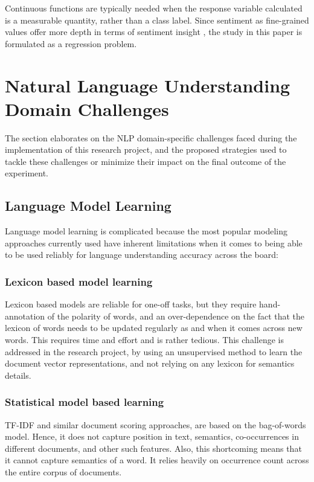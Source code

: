 \documentclass[conference]{IEEEtran}
\begin{document}
        Continuous functions are typically needed when the response variable calculated is a measurable quantity, rather than a class label. Since sentiment as fine-grained values offer more depth in terms of sentiment insight \cite{drake2008sentiment}, the study in this paper is formulated as a regression problem.

\vspace{5mm}

\section{Natural Language Understanding Domain Challenges}
    The section elaborates on the NLP domain-specific challenges faced during the implementation of this research project, and the proposed strategies used to tackle these challenges or minimize their impact on the final outcome of the experiment.

    \subsection{Language Model Learning}
        Language model learning is complicated because the most popular modeling approaches currently used have inherent limitations when it comes to being able to be used reliably for language understanding accuracy across the board:
        
        \subsubsection{Lexicon based model learning}
            Lexicon based models are reliable for one-off tasks, but they require hand-annotation of the polarity of words, and an over-dependence on the fact that the lexicon of words needs to be updated regularly as and when it comes across new words. 
            This requires time and effort and is rather tedious. 
            This challenge is addressed in the research project, by using an unsupervised method to learn the document vector representations, and not relying on any lexicon for semantics details.

        \subsubsection{Statistical model based learning}
            TF-IDF and similar document scoring approaches, are based on the bag-of-words model. Hence, it does not capture position in text, semantics, co-occurrences in different documents, and other such features. Also, this shortcoming means that it cannot capture semantics of a word. It relies heavily on occurrence count across the entire corpus of documents.
\end{document}
